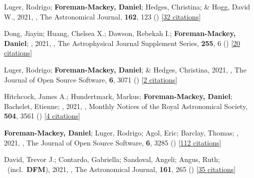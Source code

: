 \item[{\color{numcolor}\scriptsize70}] Luger, Rodrigo; \textbf{Foreman-Mackey, Daniel}; Hedges, Christina; \& Hogg, David W., 2021, , The Astronomical Journal, \textbf{162}, 123 () [\href{https://ui.adsabs.harvard.edu/abs/2021AJ....162..123L}{32 citations}]

\item[{\color{numcolor}\scriptsize69}] Dong, Jiayin; Huang, Chelsea X.; Dawson, Rebekah I.; \textbf{Foreman-Mackey, Daniel}; \etal, 2021, , The Astrophysical Journal Supplement Series, \textbf{255}, 6 () [\href{https://ui.adsabs.harvard.edu/abs/2021ApJS..255....6D}{20 citations}]

\item[{\color{numcolor}\scriptsize68}] Luger, Rodrigo; \textbf{Foreman-Mackey, Daniel}; \& Hedges, Christina, 2021, , The Journal of Open Source Software, \textbf{6}, 3071 () [\href{https://ui.adsabs.harvard.edu/abs/2021JOSS....6.3071L}{2 citations}]

\item[{\color{numcolor}\scriptsize67}] Hitchcock, James A.; Hundertmark, Markus; \textbf{Foreman-Mackey, Daniel}; Bachelet, Etienne; \etal, 2021, , Monthly Notices of the Royal Astronomical Society, \textbf{504}, 3561 () [\href{https://ui.adsabs.harvard.edu/abs/2021MNRAS.504.3561H}{4 citations}]

\item[{\color{numcolor}\scriptsize66}] \textbf{Foreman-Mackey, Daniel}; Luger, Rodrigo; Agol, Eric; Barclay, Thomas; \etal, 2021, , The Journal of Open Source Software, \textbf{6}, 3285 () [\href{https://ui.adsabs.harvard.edu/abs/2021JOSS....6.3285F}{112 citations}]

\item[{\color{numcolor}\scriptsize65}] David, Trevor J.; Contardo, Gabriella; Sandoval, Angeli; Angus, Ruth; \etal\ (incl.\ \textbf{DFM}), 2021, , The Astronomical Journal, \textbf{161}, 265 () [\href{https://ui.adsabs.harvard.edu/abs/2021AJ....161..265D}{35 citations}]

